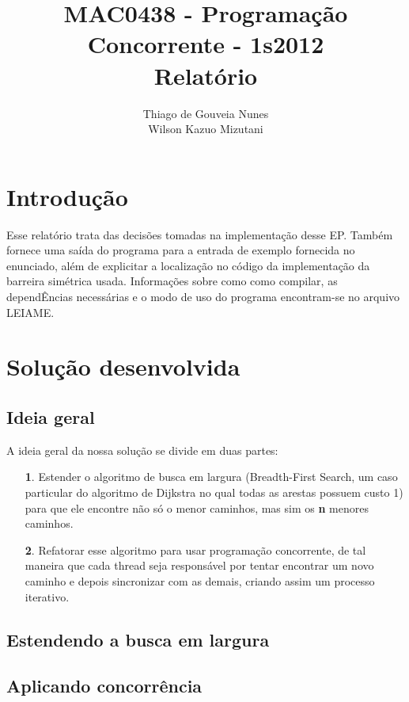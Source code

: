 \documentclass[a4paper,11pt]{article}
\title{MAC0438 - Programação Concorrente - 1s2012 \\ Relatório}
\author{Thiago de Gouveia Nunes \\ Wilson Kazuo Mizutani}
\begin{document}
\maketitle
\tableofcontents

\clearpage
\section{Introdução}
  Esse relatório trata das decisões tomadas na implementação desse EP. Também
fornece uma saída do programa para a entrada de exemplo fornecida no enunciado,
além de explicitar a localização no código da implementação da barreira
simétrica usada.
  Informações sobre como como compilar, as dependÊncias necessárias e o modo de
uso do programa encontram-se no arquivo LEIAME.

\section{Solução desenvolvida}

  \subsection{Ideia geral}
    A ideia geral da nossa solução se divide em duas partes:
      \begin{itemize}
        \item[\textbf 1.]
          Estender o algoritmo de busca em largura (Breadth-First Search, um
          caso particular do algoritmo de Dijkstra no qual todas as arestas
          possuem custo 1) para que ele encontre não só o menor caminhos, mas
          sim os {\textbf n} menores caminhos.
        \item[\textbf 2.]
          Refatorar esse algoritmo para usar programação concorrente, de tal
          maneira que cada thread seja responsável por tentar encontrar um novo
          caminho e depois sincronizar com as demais, criando assim um processo
          iterativo.
      \end{itemize}

  \subsection{Estendendo a busca em largura}

  \subsection{Aplicando concorrência}
\end{document}
